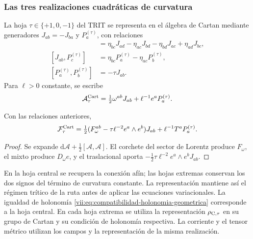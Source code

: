 \subsubsection{Las tres realizaciones cuadráticas de curvatura}

La hoja \(\tau\in\{+1,0,-1\}\) del TRIT se representa en
el álgebra de Cartan mediante generadores \(J_{ab}=-J_{ba}\)
y \(P_a^{(\tau)}\), con relaciones
\begin{align*}
 [J_{ab},J_{cd}]&=
 \eta_{bc}J_{ad}-\eta_{ac}J_{bd}
 -\eta_{bd}J_{ac}+\eta_{ad}J_{bc},\\
 [J_{ab},P_c^{(\tau)}]&=
 \eta_{bc}P_a^{(\tau)}-\eta_{ac}P_b^{(\tau)},\\
 [P_a^{(\tau)},P_b^{(\tau)}]&=-\tau J_{ab}.
\end{align*}
Para \(\ell>0\) constante, se escribe
\[
 \mathcal A_\tau^{\rm Cart}
 =\tfrac12\omega^{ab}J_{ab}+\ell^{-1}e^aP_a^{(\tau)}.
\]

\begin{proposition}
\label{vii:prop:curvatura-tritificada}
Con las relaciones anteriores,
\begin{equation}
 \mathcal F_\tau^{\rm Cart}
 =\tfrac12(F_\omega^{ab}-\tau\ell^{-2}e^a\wedge e^b)J_{ab}
     +\ell^{-1}T^aP_a^{(\tau)}.
 \label{vii:eq:curvatura-tritificada}
\end{equation}
\end{proposition}
\begin{proof}
Se expande \(\mathrm d\mathcal A+\tfrac12[\mathcal A,\mathcal A]\).
El corchete del sector de Lorentz produce \(F_\omega\), el
mixto produce \(D_\omega e\), y el traslacional aporta
\(-\tfrac12\tau\ell^{-2}e^a\wedge e^bJ_{ab}\).
\end{proof}

En la hoja central se recupera la conexión afín; las hojas extremas
conservan los dos signos del término de curvatura constante. La
representación mantiene así el régimen trítico de la ruta antes de
aplicar las ecuaciones variacionales. La igualdad de holonomía
\eqref{vii:eq:compatibilidad-holonomia-geometrica} corresponde a la
hoja central. En cada hoja extrema se utiliza la representación
\(\rho_{{\rm C},\tau}\) en su grupo de Cartan y su condición
de holonomía respectiva. La corriente y el tensor métrico utilizan
los campos y la representación de la misma realización.
